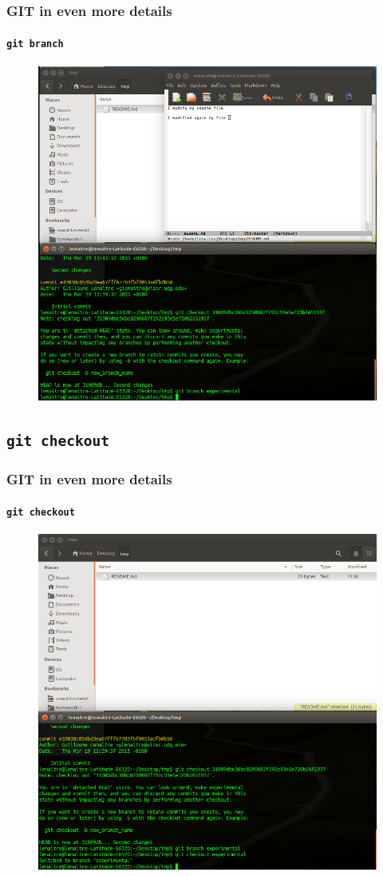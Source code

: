 \documentclass{beamer}
\begin{document}
\begin{frame}
  \frametitle{GIT in even more details}
  \framesubtitle{\texttt{git branch}}
  \begin{figure}
      \centering
      \includegraphics[width=.65\textwidth]{./images/workflow/branch.png}
    \end{figure}
\end{frame}

\subsection{\texttt{git checkout}}

\begin{frame}
  \frametitle{GIT in even more details}
  \framesubtitle{\texttt{git checkout}}
  \begin{figure}
      \centering
      \includegraphics[width=.65\textwidth]{./images/workflow/checkout.png}
    \end{figure}
\end{frame}
\end{document}
